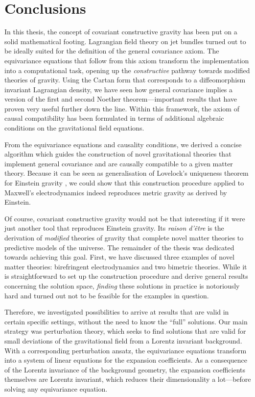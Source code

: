 \chapter{Conclusions}

In this thesis, the concept of covariant constructive gravity has been put on a solid mathematical footing. Lagrangian field theory on jet bundles turned out to be ideally suited for the definition of the general covariance axiom. The equivariance equations that follow from this axiom transform the implementation into a computational task, opening up the \emph{constructive} pathway towards modified theories of gravity. Using the Cartan form that corresponds to a diffeomorphism invariant Lagrangian density, we have seen how general covariance implies a version of the first and second Noether theorem---important results that have proven very useful further down the line. Within this framework, the axiom of causal compatibility has been formulated in terms of additional algebraic conditions on the gravitational field equations.

From the equivariance equations and causality conditions, we derived a concise algorithm which guides the construction of novel gravitational theories that implement general covariance and are causally compatible to a given matter theory. Because it can be seen as generalisation of Lovelock's uniqueness theorem for Einstein gravity \cite{Lovelock_1969,Lovelock_1971,Lovelock_1972}, we could show that this construction procedure applied to Maxwell's electrodynamics indeed reproduces metric gravity as derived by Einstein.

Of course, covariant constructive gravity would not be that interesting if it were just another tool that reproduces Einstein gravity. Its \emph{raison d'\^etre} is the derivation of \emph{modified} theories of gravity that complete novel matter theories to predictive models of the universe. The remainder of the thesis was dedicated towards achieving this goal. First, we have discussed three examples of novel matter theories: birefringent electrodynamics and two bimetric theories. While it is straightforward to set up the construction procedure and derive general results concerning the solution space, \emph{finding} these solutions in practice is notoriously hard and turned out not to be feasible for the examples in question.

Therefore, we investigated possibilities to arrive at results that are valid in certain specific settings, without the need to know the ``full'' solutions. Our main strategy was perturbation theory, which seeks to find solutions that are valid for small deviations of the gravitational field from a Lorentz invariant background. With a corresponding perturbation ansatz, the equivariance equations transform into a system of linear equations for the expansion coefficients. As a consequence of the Lorentz invariance of the background geometry, the expansion coefficients themselves are Lorentz invariant, which reduces their dimensionality a lot---before solving any equivariance equation.

